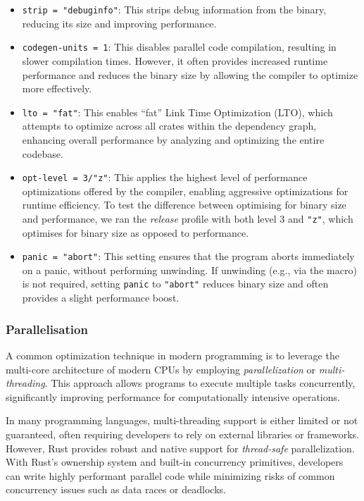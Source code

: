 \documentclass[11pt]{report}
\theoremstyle{definition}
\theoremstyle{plain}
\begin{document}
\begin{itemize}
  \item \texttt{strip = "debuginfo"}: This strips debug information from the binary, reducing its size and improving performance.

  \item \texttt{codegen-units = 1}: This disables parallel code compilation, resulting in slower compilation times. However, it often provides increased runtime performance and reduces the binary size by allowing the compiler to optimize more effectively.

  \item \texttt{lto = "fat"}: This enables ``fat'' Link Time Optimization (LTO), which attempts to optimize across all crates within the dependency graph, enhancing overall performance by analyzing and optimizing the entire codebase.

  \item \texttt{opt-level = 3/"z"}: This applies the highest level of performance optimizations offered by the compiler, enabling aggressive optimizations for runtime efficiency. To test the difference between optimising for binary size and performance, we ran the \textit{release} profile with both level 3 and \texttt{"z"}, which optimises for binary size as opposed to performance.

  \item \texttt{panic = "abort"}: This setting ensures that the program aborts immediately on a panic, without performing unwinding. If unwinding (e.g., via the  macro) is not required, setting \texttt{panic} to \texttt{"abort"} reduces binary size and often provides a slight performance boost.
\end{itemize}

\subsubsection{Parallelisation}
A common optimization technique in modern programming is to leverage the multi-core architecture of modern CPUs by employing \textit{parallelization} or \textit{multi-threading}. This approach allows programs to execute multiple tasks concurrently, significantly improving performance for computationally intensive operations.

In many programming languages, multi-threading support is either limited or not guaranteed, often requiring developers to rely on external libraries or frameworks. However, Rust provides robust and native support for \textit{thread-safe} parallelization. With Rust's ownership system and built-in concurrency primitives, developers can write highly performant parallel code while minimizing risks of common concurrency issues such as data races or deadlocks.
\end{document}
